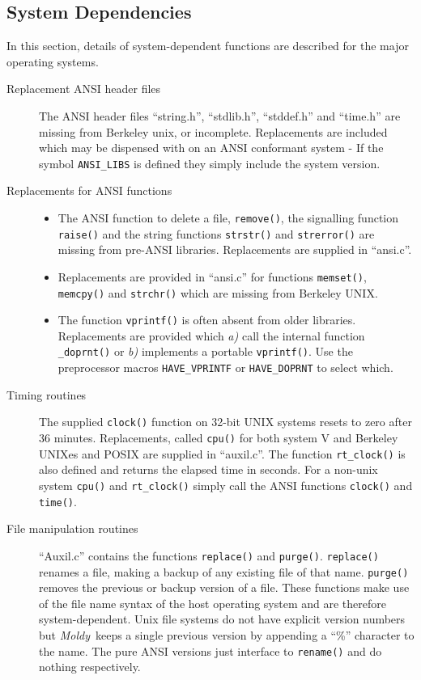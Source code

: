 \documentclass[twoside]{report}
\newcommand{\moldy}{{\em Moldy}}
\begin{document}
\subsection{System Dependencies}
In this section, details of system-dependent functions are described
for the major operating systems.
  \begin{description}
\item[Replacement ANSI header files]
 \begin{sloppypar}
   The ANSI header files ``string.h'', ``stdlib.h'', ``stddef.h'' and
   ``time.h'' are missing from Berkeley unix, or incomplete.
   Replacements are included which may be dispensed with on an ANSI
   conformant system - If the symbol \texttt{ANSI\_LIBS} is defined
   they simply include the system version.
 \end{sloppypar}

\item[Replacements for ANSI functions] \hspace*{1em}
\noindent 
  \begin{itemize}
  \item The ANSI function to delete a file, \texttt{remove()}, the
    signalling function \texttt{raise()} and the string functions
    \texttt{strstr()} and \texttt{strerror()} are missing from
    pre-ANSI libraries.  Replacements are supplied in ``ansi.c''.
  \item Replacements are provided in ``ansi.c'' for functions
    \texttt{memset()}, \texttt{memcpy()} and \texttt{strchr()} which
    are missing from Berkeley UNIX.
  \item The function \texttt{vprintf()} is often absent from older
    libraries. Replacements are provided which {\em a)\/} call the
    internal function \texttt{\_doprnt()} or {\em b)\/} implements a
    portable \texttt{vprintf()}.  Use the preprocessor macros
    \texttt{HAVE\_VPRINTF} or \texttt{HAVE\_DOPRNT} to select which.
  \end{itemize}
\item[Timing routines] The supplied \texttt{clock()} function on
  32-bit UNIX systems resets to zero after 36 minutes.  Replacements,
  called \texttt{cpu()} for both system V and Berkeley UNIXes and
  POSIX are supplied in ``auxil.c''.  The function \texttt{rt\_clock()}
  is also defined and returns the elapsed time in seconds.  For a
  non-unix system \texttt{cpu()} and \texttt{rt\_clock()} simply call
  the ANSI functions \texttt{clock()} and \texttt{time()}.
\item[File manipulation routines]
 ``Auxil.c'' contains the functions \texttt{replace()} and
  \texttt{purge()}.  \texttt{replace()} renames a file, making a
  backup of any existing file of that name. \texttt{purge()} removes
  the previous or backup version of a file.  These functions make use
  of the file name syntax of the host operating system and are
  therefore system-dependent.  Unix file systems do not have explicit
  version numbers but \moldy\ keeps a single previous version by
  appending a ``\%'' character to the name.  The pure ANSI versions
  just interface to \texttt{rename()} and do nothing respectively.
\end{description}
\end{document}
